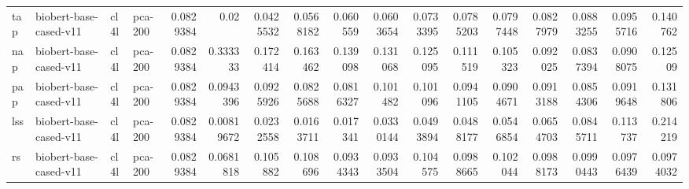 \begin{tabular}{llllrrrrrrrrrrrrr}
 tap         & biobert-base-cased-v11 & cl4l             & pca-200               &        0.0829384 &       0.02       &        0.0425532 &        0.0568182 &        0.060559  &        0.0603654 &        0.0733395 &        0.0785203 &        0.0797448 &        0.0827979 &         0.0883255 &         0.0955716 &         0.140762  \\
 nap         & biobert-base-cased-v11 & cl4l             & pca-200               &        0.0829384 &       0.333333   &        0.172414  &        0.163462  &        0.139098  &        0.131068  &        0.125095  &        0.111519  &        0.105323  &        0.092025  &         0.0837394 &         0.0908075 &         0.12509   \\
 pap         & biobert-base-cased-v11 & cl4l             & pca-200               &        0.0829384 &       0.0943396  &        0.0925926 &        0.0825688 &        0.0816327 &        0.101482  &        0.101096  &        0.0941105 &        0.0904671 &        0.0913188 &         0.0854306 &         0.0919648 &         0.131806  \\
 lss         & biobert-base-cased-v11 & cl4l             & pca-200               &        0.0829384 &       0.00819672 &        0.0232558 &        0.0163711 &        0.017341  &        0.0330144 &        0.0493894 &        0.0488177 &        0.0546854 &        0.0654703 &         0.0845711 &         0.113737  &         0.214219  \\
 rs          & biobert-base-cased-v11 & cl4l             & pca-200               &        0.0829384 &       0.0681818  &        0.105882  &        0.108696  &        0.0934343 &        0.0933504 &        0.104575  &        0.0988665 &        0.102044  &        0.0988173 &         0.0990443 &         0.0976439 &         0.0974032 \\
\hline
\end{tabular}